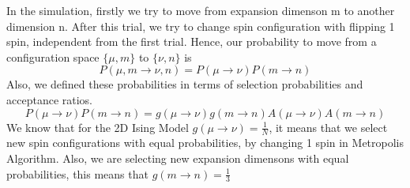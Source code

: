 \documentclass[12pt,fleqn]{report}
\begin{document}
In the simulation, firstly we try to move from expansion dimenson m to 
another dimension n. After this trial, we try to change spin configuration 
with flipping 1 spin, independent from the first trial. Hence, our probability 
to move from a configuration 
space $\{\mu, m\}$ to $\{\nu, n \}$ is 
\begin{equation}
P(\mu,m \rightarrow \nu,n) = P(\mu \rightarrow \nu) P(m \rightarrow n)
\end{equation}
Also, we defined these probabilities in terms of selection probabilities and 
acceptance ratios.
\begin{equation}
P(\mu \rightarrow \nu) P(m \rightarrow n)= 
g(\mu \rightarrow \nu) g(m \rightarrow n) A(\mu \rightarrow \nu)A(m 
\rightarrow n)
\end{equation}
We know that for the 2D Ising Model $g(\mu \rightarrow \nu)=\frac{1}{N}$, 
it means that we select new spin configurations with equal probabilities, 
by changing 1 spin in Metropolis Algorithm. Also, we are selecting new 
expansion dimensons with equal probabilities, this means that $g(m 
\rightarrow n)= \frac{1}{3}$
\end{document}
